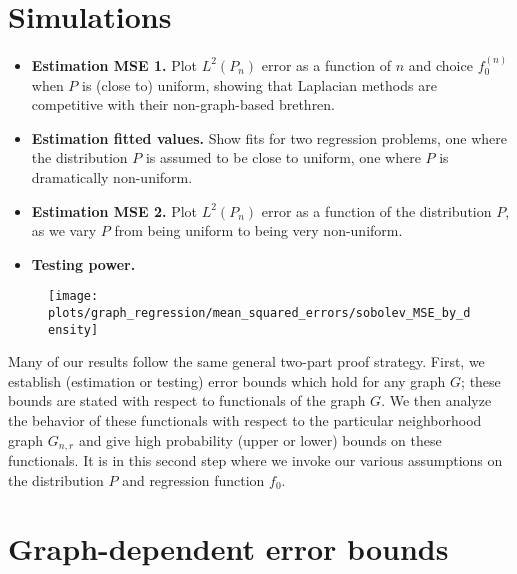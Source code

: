 \documentclass{article}
\newcommand{\1}{\mathbf{1}}
\theoremstyle{alden}
\theoremstyle{aldenthm}
\theoremstyle{definition}
\theoremstyle{remark}
\begin{document}
\section{Simulations}
\begin{itemize}
	\item \textbf{Estimation MSE 1.} Plot $L^2(P_n)$ error as a function of $n$ and choice $f_0^{(n)}$ when $P$ is (close to) uniform, showing that Laplacian methods are competitive with their non-graph-based brethren.
	\item \textbf{Estimation fitted values.} Show fits for two regression problems, one where the distribution $P$ is assumed to be close to uniform, one where $P$ is dramatically non-uniform.
	\item \textbf{Estimation MSE 2.} Plot $L^2(P_n)$ error as a function of the distribution $P$, as we vary $P$ from being uniform to being very non-uniform.
	 
	\item \textbf{Testing power.} 
\end{itemize}

\begin{figure}
	\centering
	\texttt{[image: plots/graph\_regression/mean\_squared\_errors/sobolev\_MSE\_by\_density]}
	\caption{}
	\label{fig:piecewise_cosine}
\end{figure}

\clearpage

\appendix

Many of our results follow the same general two-part proof strategy. First, we establish (estimation or testing) error bounds which hold for any graph $G$; these bounds are stated with respect to functionals of the graph $G$. We then analyze the behavior of these functionals with respect to the particular neighborhood graph $G_{n,r}$ and give high probability (upper or lower) bounds on these functionals. It is in this second step where we invoke our various assumptions on the distribution $P$ and regression function $f_0$.

\section{Graph-dependent error bounds}
\label{sec:fixed_graph_error_bounds}
\end{document}
